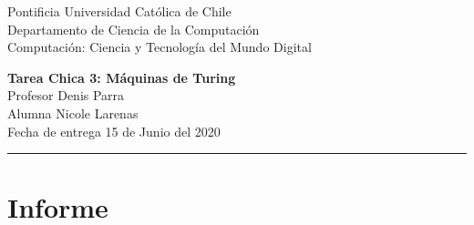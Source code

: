 \documentclass[12pt]{article}
\begin{document}
\begin{flushleft}
{\footnotesize Pontificia Universidad Católica de Chile\\
Departamento de Ciencia de la Computación\\
Computación: Ciencia y Tecnología del Mundo Digital\\
}
\begin{center}
{\huge\bf Tarea Chica 3: Máquinas de Turing}\\ \vspace{0.5cm}
Profesor Denis Parra \\
Alumna Nicole Larenas\\
Fecha de entrega 15 de Junio del 2020

\rule{\linewidth}{0.1mm}
\end{center}
\end{flushleft}

\section*{Informe}
\end{document}
